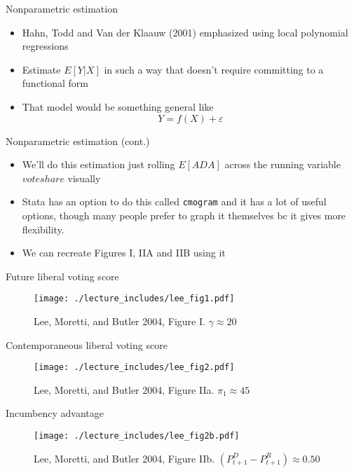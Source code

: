 \documentclass{beamer}
\begin{document}
\clearpage
\newpage

	
\begin{frame}{Nonparametric estimation}
	
	\begin{itemize}
	\item Hahn, Todd and Van der Klaauw (2001) emphasized using local polynomial regressions
	\item Estimate $E[Y|X]$ in such a way that doesn't require committing to a functional form 
	\item That model would be something general like$$Y=f(X) + \varepsilon$$
	\end{itemize}
\end{frame}

\begin{frame}{Nonparametric estimation (cont.)}

\begin{itemize}
	\item We'll do this estimation just rolling $E[ ADA ]$ across the running variable $voteshare$ visually
	\item Stata has an option to do this called \texttt{cmogram} and it has a lot of useful options, though many people prefer to graph it themselves bc it gives more flexibility.  
	\item We can recreate Figures I, IIA and IIB using it
\end{itemize}
\end{frame}
	


\begin{frame}{Future liberal voting score}
	
	\begin{figure}
	\texttt{[image: ./lecture\_includes/lee\_fig1.pdf]}
	\caption{Lee, Moretti, and Butler 2004, Figure I. $\gamma\approx 20$}
	\end{figure}
\end{frame}

\clearpage
\newpage

\begin{frame}{Contemporaneous liberal voting score}
	
	\begin{figure}
	\texttt{[image: ./lecture\_includes/lee\_fig2.pdf]}
	\caption{Lee, Moretti, and Butler 2004, Figure IIa. $\pi_1\approx 45$}
	\end{figure}
\end{frame}


\begin{frame}{Incumbency advantage}
	
	\begin{figure}
	\texttt{[image: ./lecture\_includes/lee\_fig2b.pdf]}
	\caption{Lee, Moretti, and Butler 2004, Figure IIb. $(P_{t+1}^D - P_{t+1}^R)\approx 0.50$}
	\end{figure}
\end{frame}
\end{document}
